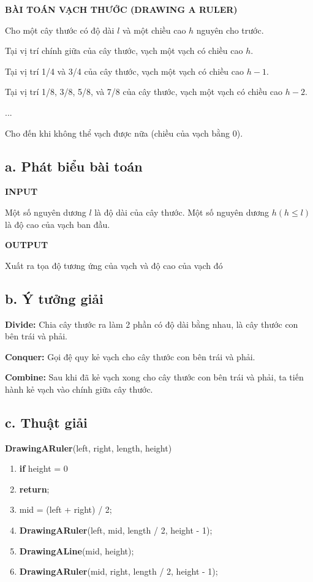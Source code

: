 \documentclass[12pt, a4paper, fleqn]{article}
\begin{document}
	
	\textbf{BÀI TOÁN VẠCH THƯỚC (DRAWING A RULER)}
	
	Cho một cây thước có độ dài $l$ và một chiều cao $h$ nguyên cho trước.
	
	Tại vị trí chính giữa của cây thước, vạch một vạch có chiều cao $h$.
	
	Tại vị trí 1/4 và 3/4 của cây thước, vạch một vạch có chiều cao $h - 1$.
	
	Tại vị trí 1/8, 3/8, 5/8, và 7/8 của cây thước, vạch một vạch có chiều cao $h - 2$.
	
	...
	
	Cho đến khi không thể vạch được nữa (chiều của vạch bằng 0).
	
	\subsection*{a. Phát biểu bài toán}
	
	\textbf{INPUT}
	
	Một số nguyên dương $l$ là độ dài của cây thước.
	Một số nguyên dương $h (h \leq l)$ là độ cao của vạch ban đầu.
	
	\textbf{OUTPUT}
	
	Xuất ra tọa độ tương ứng của vạch và độ cao của vạch đó
	
	\subsection*{b. Ý tưởng giải}
	
	\textbf{Divide:} Chia cây thước ra làm 2 phần có độ dài bằng nhau, là cây thước con bên trái và phải.
	
	\textbf{Conquer:} Gọi đệ quy kẻ vạch cho cây thước con bên trái và phải.
	
	\textbf{Combine:} Sau khi đã kẻ vạch xong cho cây thước con bên trái và phải, ta tiến hành kẻ vạch vào chính giữa cây thước.
	
	\subsection*{c. Thuật giải}
	
	{  \selectfont
		\textbf{DrawingARuler}(left, right, length, height)
		\begin{enumerate}
			\item \textbf{if} height = 0
			\item \qquad \textbf{return};
			\item mid = (left + right) / 2;
			\item \textbf{DrawingARuler}(left, mid, length / 2, height - 1);
			\item \textbf{DrawingALine}(mid, height);
			\item \textbf{DrawingARuler}(mid, right, length / 2, height - 1);
		\end{enumerate}
	}
	
\end{document}
